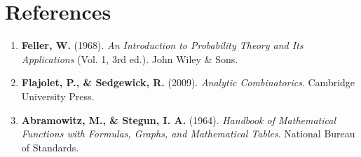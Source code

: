 \documentclass[
  letterpaper,
  DIV=11,
  numbers=noendperiod]{scrartcl}
\providecommand{\tightlist}{%
  \setlength{\itemsep}{0pt}\setlength{\parskip}{0pt}}
\begin{document}
\section{References}\label{references}

\begin{enumerate}
\def\labelenumi{\arabic{enumi}.}
\tightlist
\item
  \textbf{Feller, W.} (1968). \emph{An Introduction to Probability
  Theory and Its Applications} (Vol. 1, 3rd ed.). John Wiley \& Sons.
\item
  \textbf{Flajolet, P., \& Sedgewick, R.} (2009). \emph{Analytic
  Combinatorics}. Cambridge University Press.
\item
  \textbf{Abramowitz, M., \& Stegun, I. A.} (1964). \emph{Handbook of
  Mathematical Functions with Formulas, Graphs, and Mathematical
  Tables}. National Bureau of Standards.
\end{enumerate}
\end{document}
